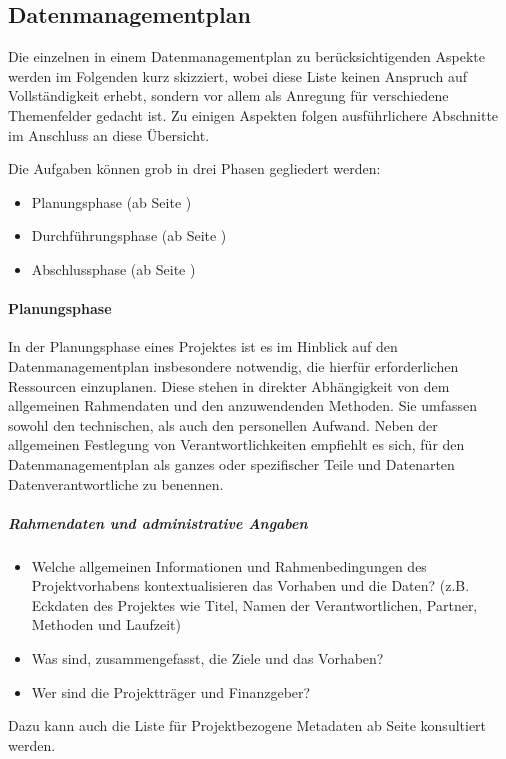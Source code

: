 \subsection{Datenmanagementplan}
Die einzelnen in einem Datenmanagementplan zu berücksichtigenden Aspekte werden im Folgenden kurz skizziert, wobei diese Liste keinen Anspruch auf Vollständigkeit erhebt, sondern vor allem als Anregung für verschiedene Themenfelder gedacht ist. Zu einigen Aspekten folgen ausführlichere Abschnitte im Anschluss an diese Übersicht. 

Die Aufgaben können grob in drei Phasen gegliedert werden:
\begin{itemize}
    \item Planungsphase (ab Seite \pageref{dmp-planung})
    \item Durchführungsphase (ab Seite \pageref{dmp-durchfuehrung})
    \item Abschlussphase (ab Seite \pageref{dmp-abschluss})
\end{itemize}

\label{dmp-planung}\paragraph{Planungsphase}
In der Planungsphase eines Projektes ist es im Hinblick auf den Datenmanagementplan insbesondere notwendig, die hierfür erforderlichen Ressourcen einzuplanen. Diese stehen in direkter Abhängigkeit von dem allgemeinen Rahmendaten und den anzuwendenden Methoden. Sie umfassen sowohl den technischen, als auch den personellen Aufwand. Neben der allgemeinen Festlegung von Verantwortlichkeiten empfiehlt es sich, für den Datenmanagementplan als ganzes oder spezifischer Teile und Datenarten Datenverantwortliche zu benennen.

\subparagraph{Rahmendaten und administrative Angaben}
\begin{itemize}
    \item Welche allgemeinen Informationen und Rahmenbedingungen des Projektvorhabens kontextualisieren das Vorhaben und die Daten? (z.B. Eckdaten des Projektes wie Titel, Namen der Verantwortlichen, Partner, Methoden und Laufzeit)
    \item Was sind, zusammengefasst, die Ziele und das Vorhaben?
    \item Wer sind die Projektträger und Finanzgeber?
\end{itemize}
Dazu kann auch die Liste für Projektbezogene Metadaten ab Seite \pageref{Metadaten-anwendung} konsultiert werden.

